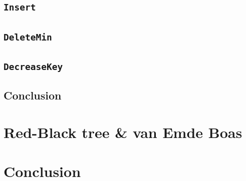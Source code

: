 \documentclass[a4paper,oneside,article,11pt]{memoir}
\begin{document}
\section{\texttt{Insert}}


\section{\texttt{DeleteMin}}

\section{\texttt{DecreaseKey}}


\section{Conclusion}


\chapter{Red-Black tree \& van Emde Boas}


\chapter{Conclusion}



\end{document}
